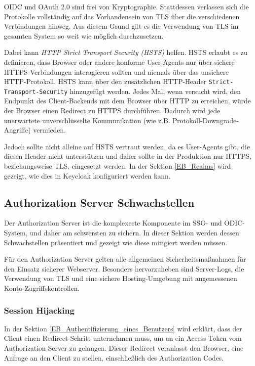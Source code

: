OIDC und OAuth 2.0 sind frei von Kryptographie. Stattdessen verlassen sich die Protokolle vollständig auf das Vorhandensein von TLS über die verschiedenen Verbindungen hinweg. Aus diesem Grund gilt es die Verwendung von TLS im gesamten System so weit wie möglich durchzusetzen.

Dabei kann \textit{HTTP Strict Transport Security (HSTS)} helfen. HSTS erlaubt es zu definieren, dass Browser oder andere konforme User-Agents nur über sichere HTTPS-Verbindungen interagieren sollten und niemals über das unsichere HTTP-Protokoll. HSTS kann über den zusätzlichen HTTP-Header \texttt{Strict-Transport-Security} hinzugefügt werden. Jedes Mal, wenn versucht wird, den Endpunkt des Client-Backends mit dem Browser über HTTP zu erreichen, würde der Browser einen Redirect zu HTTPS durchführen. Dadurch wird jede unerwartete unverschlüsselte Kommunikation (wie z.B. Protokoll-Downgrade-Angriffe) vermieden. \cite{SSEB_OAuth2inAction}

Jedoch sollte nicht alleine auf HSTS vertraut werden, da es User-Agents gibt, die diesen Header nicht unterstützen und daher sollte in der Produktion nur HTTPS, beziehungsweise TLS, eingesetzt werden. In der Sektion \ref{EB_Realms} wird gezeigt, wie dies in Keycloak konfiguriert werden kann.

\subsection{Authorization Server Schwachstellen}

Der Authorization Server ist die komplexeste Komponente im SSO- und ODIC-System, und daher am schwersten zu sichern. In dieser Sektion werden dessen Schwachstellen präsentiert und gezeigt wie diese mitigiert werden müssen.

Für den Authorization Server gelten alle allgemeinen Sicherheitsmaßnahmen für den Einsatz sicherer Webserver. Besonders hervorzuheben sind Server-Logs, die Verwendung von TLS und eine sichere Hosting-Umgebung mit angemessenen Konto-Zugriffskontrollen.


\subsubsection{Session Hijacking}

In der Sektion \ref{EB_Authentifizierung_eines_Benutzers} wird erklärt, dass der Client einen Redirect-Schritt unternehmen muss, um an ein Access Token vom Authorization Server zu gelangen. Dieser Redirect veranlasst den Browser, eine Anfrage an den Client zu stellen, einschließlich des Authorization Codes.

